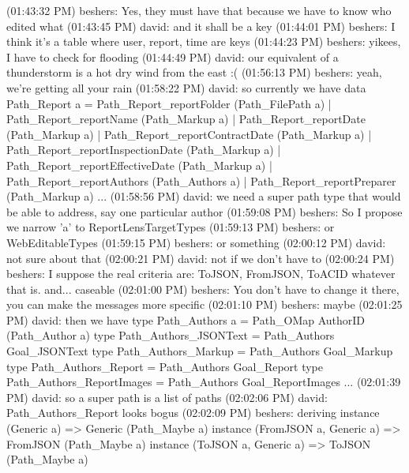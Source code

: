 (01:43:32 PM) beshers: Yes, they must have that because we have to know who
edited what
(01:43:45 PM) david: and it shall be a key
(01:44:01 PM) beshers: I think it's a table where user, report, time are keys
(01:44:23 PM) beshers: yikees, I have to check for flooding
(01:44:49 PM) david: our equivalent of a thunderstorm is a hot dry wind from
the east :(
(01:56:13 PM) beshers: yeah, we're getting all your rain
(01:58:22 PM) david: so currently we have
data Path_Report a
= Path_Report_reportFolder (Path_FilePath a)
| Path_Report_reportName (Path_Markup a)
| Path_Report_reportDate (Path_Markup a)
| Path_Report_reportContractDate (Path_Markup a)
| Path_Report_reportInspectionDate (Path_Markup a)
| Path_Report_reportEffectiveDate (Path_Markup a)
| Path_Report_reportAuthors (Path_Authors a)
| Path_Report_reportPreparer (Path_Markup a) ...
(01:58:56 PM) david: we need a super path type that would be able to address,
say one particular author
(01:59:08 PM) beshers: So I propose we narrow 'a' to ReportLensTargetTypes
(01:59:13 PM) beshers: or WebEditableTypes
(01:59:15 PM) beshers: or something
(02:00:12 PM) david: not sure about that
(02:00:21 PM) david: not if we don't have to
(02:00:24 PM) beshers: I suppose the real criteria are: ToJSON, FromJSON,
ToACID whatever that is. and... caseable
(02:01:00 PM) beshers: You don't have to change it there, you can make the
messages more specific
(02:01:10 PM) beshers: maybe
(02:01:25 PM) david: then we have
type Path_Authors a = Path_OMap AuthorID (Path_Author a)
type Path_Authors_JSONText = Path_Authors Goal_JSONText
type Path_Authors_Markup = Path_Authors Goal_Markup
type Path_Authors_Report = Path_Authors Goal_Report
type Path_Authors_ReportImages = Path_Authors Goal_ReportImages ...
(02:01:39 PM) david: so a super path is a list of paths
(02:02:06 PM) david: Path_Authors_Report looks bogus
(02:02:09 PM) beshers: deriving instance (Generic a) => Generic (Path_Maybe a)
instance (FromJSON a, Generic a) => FromJSON (Path_Maybe a)
instance (ToJSON a, Generic a) => ToJSON (Path_Maybe a)

